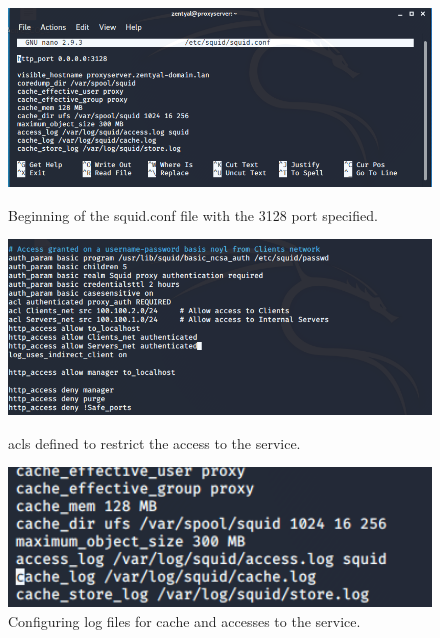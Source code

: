 \begin{figure}[!htb]
\centering
\begin{minipage}{.33\textwidth}
  \centering
  \includegraphics[width=1\textwidth]{squidConf1.png}
  \caption[a]{Beginning of the squid.conf file with the 3128 port specified.}\label{fig:4}
\end{minipage}%
\begin{minipage}{.33\textwidth}
  \centering
  \includegraphics[width=1\textwidth]{squidConf2.png}
  \caption[a]{acls defined to restrict the access to the service.}\label{fig:5}
\end{minipage}
\begin{minipage}{.33\textwidth}
  \centering
  \includegraphics[width=1\textwidth]{squidConf3.png}
  \caption[a]{Configuring log files for cache and accesses to the service.}\label{fig:6}
\end{minipage}
\end{figure}
